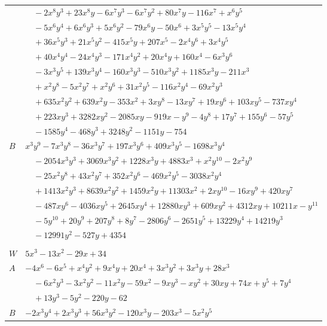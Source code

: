 \documentclass[11pt]{article}
\begin{document}
\begin{longtable}{@{}ll@{}}
 & $\quad -2x^{8}y^{3}+23x^{8}y-6x^{7}y^{3}-6x^{7}y^{2}+80x^{7}y-116x^{7}+x^{6}y^{5}$\\
 & $\quad -5x^{6}y^{4}+6x^{6}y^{3}+5x^{6}y^{2}-79x^{6}y-50x^{6}+3x^{5}y^{5}-13x^{5}y^{4}$\\
 & $\quad +36x^{5}y^{3}+21x^{5}y^{2}-415x^{5}y+207x^{5}-2x^{4}y^{6}+3x^{4}y^{5}$\\
 & $\quad +40x^{4}y^{4}-24x^{4}y^{3}-171x^{4}y^{2}+20x^{4}y+160x^{4}-6x^{3}y^{6}$\\
 & $\quad -3x^{3}y^{5}+139x^{3}y^{4}-160x^{3}y^{3}-510x^{3}y^{2}+1185x^{3}y-211x^{3}$\\
 & $\quad +x^{2}y^{8}-5x^{2}y^{7}+x^{2}y^{6}+31x^{2}y^{5}-116x^{2}y^{4}-69x^{2}y^{3}$\\
 & $\quad +635x^{2}y^{2}+639x^{2}y-353x^{2}+3xy^{8}-13xy^{7}+19xy^{6}+103xy^{5}-737xy^{4}$\\
 & $\quad +223xy^{3}+3282xy^{2}-2085xy-919x-y^{9}-4y^{8}+17y^{7}+155y^{6}-57y^{5}$\\
 & $\quad -1585y^{4}-468y^{3}+3248y^{2}-1151y-754$\\
$B$ & $x^{3}y^{9}-7x^{3}y^{8}-36x^{3}y^{7}+197x^{3}y^{6}+409x^{3}y^{5}-1698x^{3}y^{4}$\\
 & $\quad -2054x^{3}y^{3}+3069x^{3}y^{2}+1228x^{3}y+4883x^{3}+x^{2}y^{10}-2x^{2}y^{9}$\\
 & $\quad -25x^{2}y^{8}+43x^{2}y^{7}+352x^{2}y^{6}-469x^{2}y^{5}-3038x^{2}y^{4}$\\
 & $\quad +1413x^{2}y^{3}+8639x^{2}y^{2}+1459x^{2}y+11303x^{2}+2xy^{10}-16xy^{9}+420xy^{7}$\\
 & $\quad -487xy^{6}-4036xy^{5}+2645xy^{4}+12880xy^{3}+609xy^{2}+4312xy+10211x-y^{11}$\\
 & $\quad -5y^{10}+20y^{9}+207y^{8}+8y^{7}-2806y^{6}-2651y^{5}+13229y^{4}+14219y^{3}$\\
 & $\quad -12991y^{2}-527y+4354$\\
\addlinespace[3pt]
\multicolumn{2}{@{}l}{$i=8$, $m=1$, neighbours $18,20,21,29,34,36$}\\
$W$ & $5x^{3}-13x^{2}-29x+34$\\
$A$ & $-4x^{6}-6x^{5}+x^{4}y^{2}+9x^{4}y+20x^{4}+3x^{3}y^{2}+3x^{3}y+28x^{3}$\\
 & $\quad -6x^{2}y^{3}-3x^{2}y^{2}-11x^{2}y-59x^{2}-9xy^{3}-xy^{2}+30xy+74x+y^{5}+7y^{4}$\\
 & $\quad +13y^{3}-5y^{2}-220y-62$\\
$B$ & $-2x^{3}y^{4}+2x^{3}y^{3}+56x^{3}y^{2}-120x^{3}y-203x^{3}-5x^{2}y^{5}$\\

\end{longtable}
\end{document}
